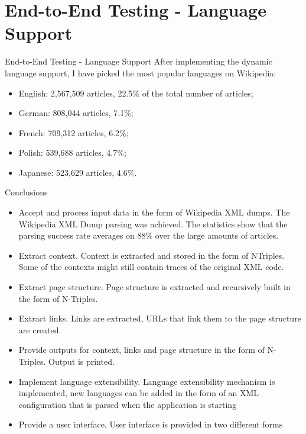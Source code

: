 \documentclass[czech,aspectratio=169]{beamer}
\begin{document}
	\section{End-to-End Testing - Language Support}
	\begin{frame}{End-to-End Testing - Language Support}
		After implementing the dynamic language support, I have picked the most popular languages on Wikipedia:
		\begin{itemize}
			\item English: 2,567,509 articles, 22.5\% of the total number of articles;
			\item German: 808,044 articles, 7.1\%;
			\item French: 709,312 articles, 6.2\%;
			\item Polish: 539,688 articles, 4.7\%;
			\item Japanese: 523,629 articles, 4.6\%.
		\end{itemize}
	\end{frame}



    \begin{frame}{Conclusions}
        \begin{itemize}
            \item Accept and process input data in the form of Wikipedia XML
dumps. The Wikipedia XML Dump parsing was achieved. The statistics show that
the parsing success rate averages on 88\% over the large amounts of
articles.
 \item Extract context. Context is extracted and stored in the form of NTriples.
Some of the contexts might still contain traces of the original
XML code.
 \item Extract page structure. Page structure is extracted and recursively
built in the form of N-Triples.
 \item Extract links. Links are extracted, URLs that link them to the page
structure are created.
\item Provide outputs for context, links and page structure in the
form of N-Triples. Output is printed.
\item Implement language extensibility. Language extensibility mechanism
is implemented, new languages can be added in the form of an
XML configuration that is parsed when the application is starting
\item Provide a user interface. User interface is provided in two different
forms
        \end{itemize}
    
    \end{frame}
    
\end{document}
